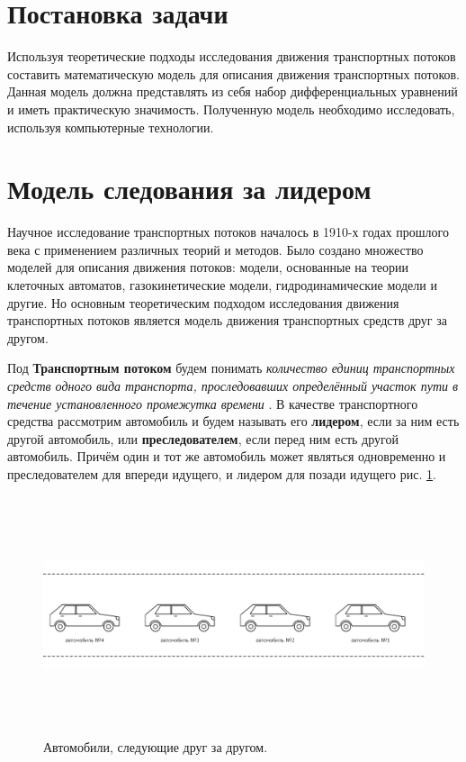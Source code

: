 \documentclass[12pt, a4paper]{extarticle}
\numberwithin{equation}{section}
\begin{document}
\newpage
\section{Постановка задачи} 
Используя теоретические подходы исследования движения транспортных потоков составить математическую модель для описания движения транспортных потоков. Данная модель должна представлять из себя набор дифференциальных уравнений и иметь практическую значимость. Полученную модель необходимо исследовать, используя компьютерные технологии.   

\newpage
\section{Модель следования за лидером}
Научное исследование транспортных потоков началось в 1910-х годах прошлого века с применением различных теорий и методов. Было создано множество моделей для описания движения потоков: модели, основанные на теории клеточных автоматов, газокинетические модели, гидродинамические модели и другие. Но основным теоретическим подходом исследования движения транспортных потоков является  модель движения транспортных средств друг за другом.

Под \textbf{Транспортным потоком} будем понимать {\it количество единиц транспортных средств одного вида транспорта, проследовавших определённый участок пути в течение установленного промежутка времени} \cite{TrafficFlow}. В качестве транспортного средства рассмотрим автомобиль и будем называть его \textbf{лидером}, если за ним есть другой автомобиль, или \textbf{преследователем}, если перед ним есть другой автомобиль. Причём один и тот же автомобиль может являться одновременно и преследователем для впереди идущего, и лидером для позади идущего рис. \ref{car_following}. 

\begin{figure}[h!]  
	\begin{center}
		\includegraphics[keepaspectratio,width=160mm,height=70mm]{Images/car_following.png}
	\end{center}
	\caption{Автомобили, следующие друг за другом.}
	\label{car_following}
\end{figure}
\end{document}

